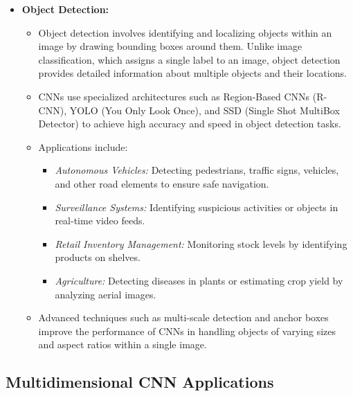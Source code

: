 \begin{itemize}
	\item \textbf{Object Detection:}
	\begin{itemize}
		\item Object detection involves identifying and localizing objects within an image by drawing bounding boxes around them. Unlike image classification, which assigns a single label to an image, object detection provides detailed information about multiple objects and their locations.
		\item CNNs use specialized architectures such as Region-Based CNNs (R-CNN), YOLO (You Only Look Once), and SSD (Single Shot MultiBox Detector) to achieve high accuracy and speed in object detection tasks.
		\item Applications include:
		\begin{itemize}
			\item \textit{Autonomous Vehicles:} Detecting pedestrians, traffic signs, vehicles, and other road elements to ensure safe navigation.
			\item \textit{Surveillance Systems:} Identifying suspicious activities or objects in real-time video feeds.
			\item \textit{Retail Inventory Management:} Monitoring stock levels by identifying products on shelves.
			\item \textit{Agriculture:} Detecting diseases in plants or estimating crop yield by analyzing aerial images.
		\end{itemize}
		\item Advanced techniques such as multi-scale detection and anchor boxes improve the performance of CNNs in handling objects of varying sizes and aspect ratios within a single image.
	\end{itemize}
\end{itemize}

\subsection{Multidimensional CNN Applications}

